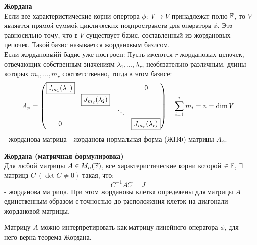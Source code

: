     \begin{theorem} \textbf{Жордана} \\
        \tab[0.5cm]Если все характеристические корни опертора $\phi: \ V \to V$ принадлежат полю $\mathbb{F}$, то $V$ является прямой суммой циклических подпространств для оператора $\phi$. Это равносильно тому, что в $V$ существует базис, составленный из жордановых цепочек. Такой базис называется жордановым базисом.\\
        \tab[0.5cm]Если жордановыйй бадис уже построен: Пусть имеются $r$ жордановых цепочек, отвечающих собственным значениям $\lambda_1, \ldots, \lambda_r$, необязательно различным, длины которых $m_1,\ldots,m_r$ соответственно, тогда в этом базисе:
        $$A_{\phi} = \begin{pmatrix}
        \text{\fbox{$J_{m_1}(\lambda_1)$}} & \null & \null & 0 \\
        \null & \text{\fbox{$J_{m_2}(\lambda_2)$}}\\
        \null & \null & \ddots\\
        0 & \null & \null & \text{\fbox{$J_{m_r}(\lambda_r)$}}\\
        \end{pmatrix} \ \ \ \sum \limits_{i=1}^rm_i = n = \dim V$$ 
        - жорданова матрица - жорданова нормальная форма (ЖНФ) матрицы $A_{\phi}$.
    \end{theorem}
    \begin{theorem}\textbf{Жордана (матричная формулировка)} \\
        Для любой матрицы $A \in M_n(\mathbb{F})$, все характеристические корни которой $\in \mathbb{F}$, $\exists$ матрица $C \ (\det C \neq 0)$ такая, что: 
        $$C^{-1}AC = J$$
        - жорданова матрица. При этом жордановы клетки определены для матрицы $A$ единственным образом с точностью до расположения клеток на диагонали жордановой матрицы.  
    \end{theorem}
    \begin{remark}
        Матрицу $A$ можно интерпретировать как матрицу линейного оператора $\phi$, для него верна теорема Жордана.  
    \end{remark}
